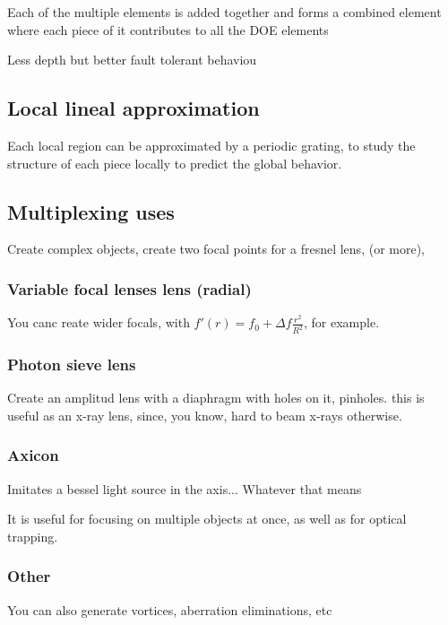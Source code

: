 \documentclass[../main/main.tex]{subfiles}
\begin{document}
Each of the multiple elements is added together and forms a combined element where each piece of it contributes to all the DOE elements

Less depth but better fault tolerant behaviou


\subsection{Local lineal approximation}

Each local region can be approximated by a periodic grating, to study the structure of each piece locally to predict the global behavior.


 \subsection{Multiplexing uses}

 Create complex objects, create two focal points for a fresnel lens, (or more),




\subsubsection{Variable focal lenses lens (radial)}

You canc reate wider focals, with $f'(r) = f_{0} + \Delta f \frac{r^{2}} { R^{2}}$, for example.

\subsubsection{Photon sieve lens}

Create an amplitud lens with a diaphragm with holes on it, pinholes. this is useful as an x-ray lens, since, you know, hard to beam x-rays otherwise.


\subsubsection{Axicon}

 Imitates a bessel light source in the axis... Whatever that means

 It is useful for focusing on multiple objects at once, as well as for optical trapping.

 \subsubsection{Other}

 You can also generate vortices, aberration eliminations, etc
\end{document}
